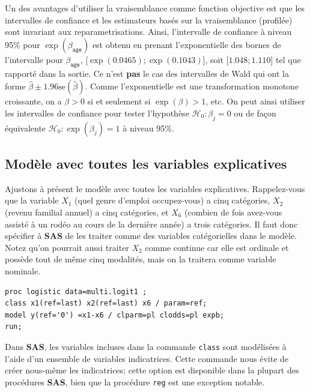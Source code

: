 \documentclass[
  11pt,
  letterpaper,
]{book}
\theoremstyle{definition}
\theoremstyle{definition}
\theoremstyle{definition}
\theoremstyle{remark}
\begin{document}
Un des avantages d'utiliser la vraisemblance comme fonction objective est que les intervalles de confiance et les estimateurs basés sur la vraisemblance (profilée) sont invariant aux reparametrisations. Ainsi, l'intervalle de confiance à niveau 95\% pour \(\exp(\beta_{\texttt{age}})\) est obtenu en prenant l'exponentielle des bornes de l'intervalle pour \(\beta_{\texttt{age}}\), {[}\(\exp(0.0465); \exp(0.1043)\){]}, soit {[}\(1.048; 1.110\){]} tel que rapporté dans la sortie. Ce n'est \textbf{pas} le cas des intervalles de Wald qui ont la forme \(\widehat{\beta} \pm 1.96 \mathrm{se}(\widehat{\beta})\).
Comme l'exponentielle est une transformation monotone croissante, on a \(\beta>0\) si et seulement si \(\exp(\beta)>1\), etc. On peut ainsi utiliser les intervalles de confiance pour tester l'hypothèse \(\mathcal{H}_0: \beta_j=0\) ou de façon équivalente \(\mathcal{H}_0: \exp(\beta_j)=1\) à niveau 95\%.

\hypertarget{moduxe8le-avec-toutes-les-variables-explicatives}{%
\subsection{Modèle avec toutes les variables explicatives}\label{moduxe8le-avec-toutes-les-variables-explicatives}}

Ajustons à présent le modèle avec toutes les variables explicatives. Rappelez-vous que la variable \(X_1\) (quel genre d'emploi occupez-vous) a cinq catégories, \(X_2\) (revenu familial annuel) a cinq catégories, et \(X_6\) (combien de fois avez-vous assisté à un rodéo au cours de la dernière année) a trois catégories. Il faut donc spécifier à \textbf{SAS} de les traiter comme des variables catégorielles dans le modèle. Notez qu'on pourrait aussi traiter \(X_2\) comme continue car elle est ordinale et possède tout de même cinq modalités, mais on la traitera comme variable nominale.

\begin{verbatim}
proc logistic data=multi.logit1 ;
class x1(ref=last) x2(ref=last) x6 / param=ref;
model y(ref='0') =x1-x6 / clparm=pl clodds=pl expb;
run;
\end{verbatim}

Dans \textbf{SAS}, les variables incluses dans la commande \texttt{class} sont modélisées à l'aide d'un ensemble de variables indicatrices. Cette commande nous évite de créer nous-même les indicatrices; cette option est disponible dans la plupart des procédures \textbf{SAS}, bien que la procédure \texttt{reg} est une exception notable.
\end{document}
